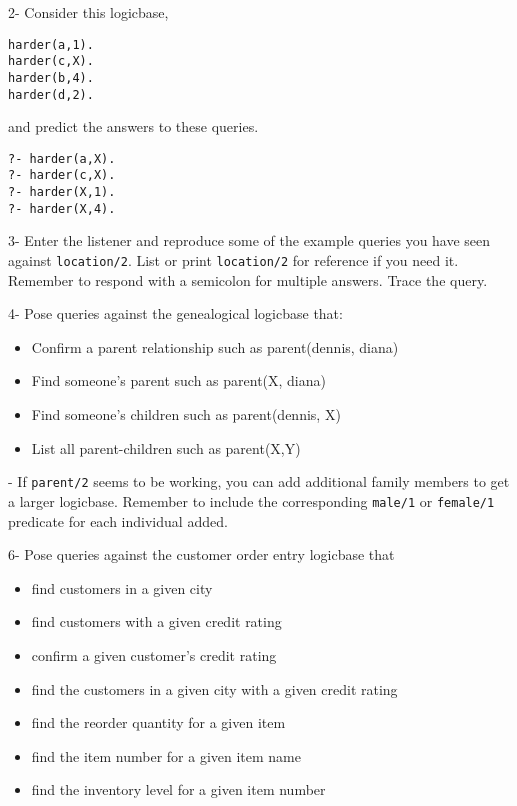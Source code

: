 2- Consider this logicbase,

\begin{verbatim}
harder(a,1).
harder(c,X).
harder(b,4).
harder(d,2).
\end{verbatim}
and predict the answers to these queries.
\begin{verbatim}
?- harder(a,X).
?- harder(c,X).
?- harder(X,1).
?- harder(X,4).
\end{verbatim}


3- Enter the listener and reproduce some of the example queries you have seen
against \verb|location/2|. List or print \verb|location/2| for reference if you
need it. Remember to respond with a semicolon \keys{;} for multiple answers.
Trace the query.


4- Pose queries against the genealogical logicbase that:
\begin{itemize}[nosep]
  \item 
Confirm a parent relationship such as parent(dennis, diana)
  \item 
Find someone's parent such as parent(X, diana)
  \item 
Find someone's children such as parent(dennis, X)
  \item 
List all parent-children such as parent(X,Y)
\end{itemize}

\bigskip{}- If \verb|parent/2| seems to be working, you can add additional family members
to get a larger logicbase. Remember to include the corresponding \verb|male/1|
or \verb|female/1| predicate for each individual added.


6- Pose queries against the customer order entry logicbase that
\begin{itemize}[nosep]
  \item 
find customers in a given city
  \item 
find customers with a given credit rating
  \item 
confirm a given customer's credit rating
  \item 
find the customers in a given city with a given credit rating
  \item 
find the reorder quantity for a given item
  \item 
find the item number for a given item name
  \item 
find the inventory level for a given item number
\end{itemize}

\secup

\secup